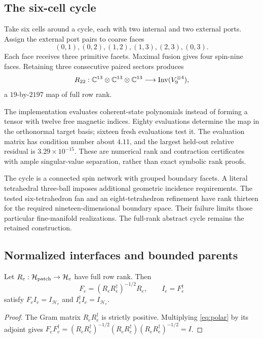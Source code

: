 \subsection{The six-cell cycle}

Take six cells around a cycle, each with two internal and two external ports. Assign the external port pairs to coarse faces
\begin{equation}
(0,1),(0,2),(1,2),(1,3),(2,3),(0,3).
\end{equation}
Each face receives three primitive facets. Maximal fusion gives four spin-nine faces. Retaining three consecutive paired sectors produces
\begin{equation}
R_{22}:\mathbb C^{13}\otimes\mathbb C^{13}\otimes\mathbb C^{13}
\longrightarrow\operatorname{Inv}(V_9^{\otimes4}),
\end{equation}
a $19$-by-$2197$ map of full row rank.

The implementation evaluates coherent-state polynomials instead of forming a tensor with twelve free magnetic indices. Eighty evaluations determine the map in the orthonormal target basis; sixteen fresh evaluations test it. The evaluation matrix has condition number about $4.11$, and the largest held-out relative residual is $3.29\times10^{-15}$. These are numerical rank and contraction certificates with ample singular-value separation, rather than exact symbolic rank proofs.

The cycle is a connected spin network with grouped boundary facets. A literal tetrahedral three-ball imposes additional geometric incidence requirements. The tested six-tetrahedron fan and an eight-tetrahedron refinement have rank thirteen for the required nineteen-dimensional boundary space. Their failure limits those particular fine-manifold realizations. The full-rank abstract cycle remains the retained construction.

\subsection{Normalized interfaces and bounded parents}

\begin{proposition}
Let $R_e:\mathcal H_{\rm patch}\to\mathcal H_e$ have full row rank. Then
\begin{equation}
F_e=(R_eR_e^\dagger)^{-1/2}R_e,\qquad I_e=F_e^\dagger
\label{eq:polar}
\end{equation}
satisfy $F_eI_e=I_{\mathcal H_e}$ and $I_e^\dagger I_e=I_{\mathcal H_e}$.
\end{proposition}
\begin{proof}
The Gram matrix $R_eR_e^\dagger$ is strictly positive. Multiplying \eqref{eq:polar} by its adjoint gives
$F_eF_e^\dagger=(R_eR_e^\dagger)^{-1/2}
(R_eR_e^\dagger)(R_eR_e^\dagger)^{-1/2}=I$.
\end{proof}

